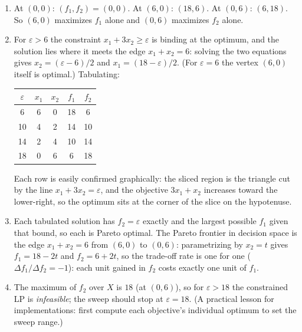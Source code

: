 
\begin{enumerate}
\item At $(0,0)$: $(f_1, f_2) = (0,0)$. At $(6,0)$: $(18, 6)$. At $(0,6)$:
$(6, 18)$. So $(6,0)$ maximizes $f_1$ alone and $(0,6)$ maximizes $f_2$
alone.
\item For $\varepsilon > 6$ the constraint $x_1 + 3x_2 \geq \varepsilon$ is
binding at the optimum, and the solution lies where it meets the edge
$x_1 + x_2 = 6$: solving the two equations gives $x_2 = (\varepsilon - 6)/2$
and $x_1 = (18 - \varepsilon)/2$. (For $\varepsilon = 6$ the vertex $(6,0)$
itself is optimal.) Tabulating:
\begin{center}
\begin{tabular}{c|cccc}
$\varepsilon$ & $x_1$ & $x_2$ & $f_1$ & $f_2$ \\\hline
6  & 6 & 0 & 18 & 6 \\
10 & 4 & 2 & 14 & 10 \\
14 & 2 & 4 & 10 & 14 \\
18 & 0 & 6 & 6  & 18 \\
\end{tabular}
\end{center}
Each row is easily confirmed graphically: the sliced region is the triangle
cut by the line $x_1 + 3x_2 = \varepsilon$, and the objective $3x_1 + x_2$
increases toward the lower-right, so the optimum sits at the corner of the
slice on the hypotenuse.
\item Each tabulated solution has $f_2 = \varepsilon$ exactly and the largest
possible $f_1$ given that bound, so each is Pareto optimal. The Pareto
frontier in decision space is the edge $x_1 + x_2 = 6$ from $(6,0)$ to
$(0,6)$: parametrizing by $x_2 = t$ gives $f_1 = 18 - 2t$ and
$f_2 = 6 + 2t$, so the trade-off rate is one for one ($\Delta f_1 / \Delta
f_2 = -1$): each unit gained in $f_2$ costs exactly one unit of $f_1$.
\item The maximum of $f_2$ over $X$ is $18$ (at $(0,6)$), so for
$\varepsilon > 18$ the constrained LP is \emph{infeasible}; the sweep should
stop at $\varepsilon = 18$. (A practical lesson for implementations: first
compute each objective's individual optimum to set the sweep range.)
\end{enumerate}



